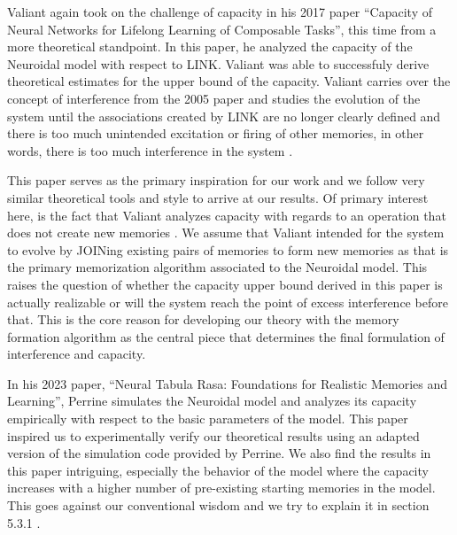 Valiant again took on the challenge of capacity in his 2017 paper ``Capacity of Neural Networks for Lifelong Learning of Composable Tasks'', this time from a more theoretical standpoint. In this paper, he analyzed the capacity of the Neuroidal model with respect to LINK. Valiant was able to successfuly derive theoretical estimates for the upper bound of the capacity. Valiant carries over the concept of interference from the 2005 paper and studies the evolution of the system until the associations created by LINK are no longer clearly defined and there is too much unintended excitation or firing of other memories, in other words, there is too much interference in the system \cite{valiant2017capacity}. 

This paper serves as the primary inspiration for our work and we follow very similar theoretical tools and style to arrive at our results. Of primary interest here, is the fact that Valiant analyzes capacity with regards to an operation that does not create new memories \cite{valiant2017capacity}. We assume that Valiant intended for the system to evolve by JOINing existing pairs of memories to form new memories as that is the primary memorization algorithm associated to the Neuroidal model. This raises the question of whether the capacity upper bound derived in this paper is actually realizable or will the system reach the point of excess interference before that. This is the core reason for developing our theory with the memory formation algorithm as the central piece that determines the final formulation of interference and capacity.

In his 2023 paper, ``Neural Tabula Rasa: Foundations for Realistic Memories and Learning'', Perrine simulates the Neuroidal model and analyzes its capacity empirically with respect to the basic parameters of the model. This paper inspired us to experimentally verify our theoretical results using an adapted version of the simulation code provided by Perrine. We also find the results in this paper intriguing, especially the behavior of the model where the capacity increases with a higher number of pre-existing starting memories in the model. This goes against our conventional wisdom and we try to explain it in section 5.3.1 \cite{perrine2023neural}.

